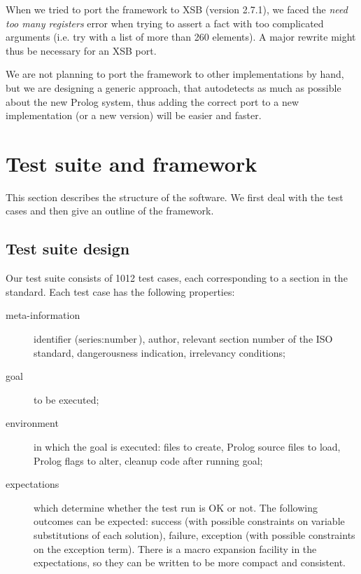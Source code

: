 \documentclass[draft]{llncs}%
\begin{document}
When we tried to port the framework to XSB (version 2.7.1), we faced the
\emph{need too many registers} error when trying to assert a fact with too
complicated arguments (i.e. try
with a list of more than 260 elements). A major rewrite might
thus be necessary for an XSB port.

We are not planning to port the framework to other implementations by hand,
but we are designing a generic approach, that autodetects as much as possible
about the new Prolog system, thus adding the correct port to a new
implementation (or a new version) will be easier and faster.

\section{Test suite and framework}

This section describes the structure of the software. We first deal with the
test cases and then give an outline of the framework.

\subsection{Test suite design}\label{suite}

Our test suite consists of 1012 test cases, each corresponding to a
section in the standard. Each test
case has the following properties:
%
\begin{description}

\item[meta-information]
identifier ($\textrm{series}:\textrm{number}$), author, relevant
section number of the ISO standard, dangerousness indication, irrelevancy
conditions;

\item[goal]
to be executed;

\item[environment]
in which the goal is executed: files to create, Prolog source files to load,
Prolog flags to alter, cleanup code after running goal;

\item[expectations]
which determine whether the test run is OK or not. The following outcomes can
be expected: success (with possible constraints on variable substitutions of
each solution), failure, exception (with possible constraints on the
exception term). There is a macro expansion facility in the expectations, so
they can be written to be more compact and consistent.

\end{description}
\end{document}
